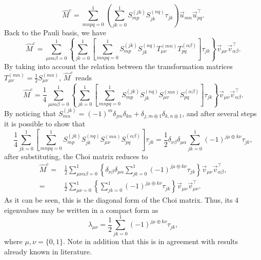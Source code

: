 \documentclass[11pt,dvipsnames]{article} %
\newcommand{\1}{\mathds{1}}
\begin{document}
\begin{equation}
\hat{M}^c=\sum_{mnpq=0}^1\left(\sum_{jk=0}^1 S_{mp}^{(jk)}S_{jk}^{(nq)}  \tau_{jk} \right) \vec{u}_{mn}\vec{u}^\intercal_{pq}.
\end{equation}
%
Back to the Pauli basis, we have
%
\begin{equation}
 \hat{M}^c=\sum_{\mu\nu\alpha\beta=0}^1\left\{\sum_{jk=0}^1\left[\sum_{mnpq=0}^1S_{mp}^{(jk)}S_{jk}^{(nq)}T_{\mu\nu}^{(mn)}T_{pq}^{(\alpha\beta)}\right]\tau_{jk}\right\}\vec{v}_{\mu\nu}\vec{v}_{\alpha\beta}^\intercal.
\end{equation}
%
By taking into account the relation between the transformation matrices $T_{\mu\nu}^{(mn)}=\frac{1}{2}S_{\mu\nu}^{(mn)}$, $\hat{M}^c$ reads
%
\begin{equation}
 \hat{M}^c=\frac{1}{4}\sum_{\mu\nu\alpha\beta=0}^1\left\{\sum_{jk=0}^1\left[\sum_{mnpq=0}^1S_{mp}^{(jk)}S_{jk}^{(nq)}S_{\mu\nu}^{(mn)}S_{pq}^{(\alpha\beta)}\right]\tau_{jk}\right\}\vec{v}_{\mu\nu}\vec{v}_{\alpha\beta}^\intercal.
\end{equation}
%
By noticing that $S_{mn}^{(jk)}=(-1)^m\delta_{jm}\delta_{kn}+\delta_{j,m\oplus 1}\delta_{k,n\oplus 1}$, and after several steps it is possible to show that 
% 
\begin{equation}
\frac{1}{4}\sum_{jk=0}^1\left[\sum_{mnpq=0}^1S_{mp}^{(jk)}S_{jk}^{(nq)}S_{\mu\nu}^{(mn)}S_{pq}^{(\alpha\beta)}\right]\tau_{jk}=\frac{1}{2}\delta_{\nu\beta}\delta_{\mu\alpha}\sum_{jk=0}^1(-1)^{j\mu\oplus k\nu}\tau_{jk},
\label{EQAL2}
\end{equation}
% 
after substituting, the Choi matrix reduces to
%
\begin{align}
 \hat{M}^c=&\frac{1}{2}\sum_{\mu\nu\alpha\beta=0}^1\left\{\delta_{\nu\beta}\delta_{\mu\alpha}\sum_{jk=0}^1(-1)^{j\mu\oplus k\nu}\tau_{jk}\right\}\vec{v}_{\mu\nu}\vec{v}_{\alpha\beta}^\intercal,\\
 =&\frac{1}{2}\sum_{\mu\nu=0}^1\left\{\sum_{jk=0}^1(-1)^{j\mu\oplus k\nu}\tau_{jk}\right\}\vec{v}_{\mu\nu}\vec{v}_{\mu\nu}^\intercal.
\end{align}
%
As it can be seen, this is the diagonal form of the Choi matrix. Thus, its 4 eigenvalues may be written in a compact form as
%
\begin{equation}
\lambda_{\mu\nu}=\frac{1}{2}\sum_{jk=0}^1(-1)^{j\mu\oplus k\nu}\tau_{jk},
\end{equation}
%
where $\mu,\nu=\{0,1\}$. Note in addition that this is in agreement with results already known in literature.
\end{document}
